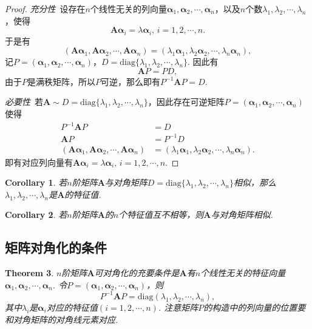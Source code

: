 \documentclass{article}
\newtheorem{theorem}{Theorem}[section]
\newtheorem{corollary}[theorem]{Corollary}
\newcommand{\mbf}[1]{\bm{#1}}
\begin{document}
\begin{proof}
\rm \emph{充分性}\ 设存在$n$个线性无关的列向量$\mbf{\alpha}_1,\mbf{\alpha}_2,\cdots,\mbf{\alpha}_n$，以及$n$个数$\lambda_1,\lambda_2,\cdots,\lambda_n$，使得
$$
\mbf{A}\mbf{\alpha}_i = \lambda\mbf{\alpha}_i,\, i = 1,2,\cdots,n.
$$
于是有
$$
(\mbf{A}\mbf{\alpha}_1,\mbf{A}\mbf{\alpha}_2,\cdots,\mbf{A}\mbf{\alpha}_n) = (\lambda_1\mbf{\alpha}_1,\lambda_2\mbf{\alpha}_2,\cdots,\lambda_n\mbf{\alpha}_n),
$$
记$P=(\mbf{\alpha}_1,\mbf{\alpha}_2,\cdots,\mbf{\alpha}_n)，D = \text{diag}\{\lambda_1,\lambda_2,\cdots,\lambda_n\}$. 因此有
$$
\mbf{A}P = PD,
$$
由于$P$是满秩矩阵，所以$P$可逆，那么即有$P^{-1}\mbf{A}P = D$.

\emph{必要性}\ 若$\mbf{A} \sim D=\text{diag}\{\lambda_1,\lambda_2,\cdots,\lambda_n\}$，因此存在可逆矩阵$P=(\mbf{\alpha}_1,\mbf{\alpha}_2,\cdots,\mbf{\alpha}_n)$使得
$$
\begin{array}{rl}
P^{-1}\mbf{A}P &= D\\
\mbf{A}P &= P^{-1}D\\
(\mbf{A}\mbf{\alpha}_1,\mbf{A}\mbf{\alpha}_2,\cdots,\mbf{A}\mbf{\alpha}_n) &= (\lambda_1\mbf{\alpha}_1,\lambda_2\mbf{\alpha}_2,\cdots,\lambda_n\mbf{\alpha}_n).
\end{array}
$$
即有对应列向量有$\mbf{A}\mbf{\alpha}_i = \lambda\mbf{\alpha}_i,\, i = 1,2,\cdots,n.$
\end{proof}

\begin{corollary}
\rm 若$n$阶矩阵$\mbf{A}$与对角矩阵$D=\text{diag}\{\lambda_1,\lambda_2,\cdots,\lambda_n\}$相似，那么$\lambda_1,\lambda_2,\cdots,\lambda_n$是$\mbf{A}$的特征值.
\end{corollary}


\begin{corollary}
\rm 若$n$阶矩阵$\mbf{A}$的$n$个特征值互不相等，则$\mbf{A}$与对角矩阵相似.
\end{corollary}

\subsection{矩阵对角化的条件}

\begin{theorem}
\rm $n$阶矩阵$\mbf{A}$可对角化的充要条件是$\mbf{A}$有$n$个线性无关的特征向量$\mbf{\alpha}_1,\mbf{\alpha}_2,\cdots,\mbf{\alpha}_n$. 令$P=(\mbf{\alpha}_1,\mbf{\alpha}_2,\cdots,\mbf{\alpha}_n)$，则
$$
P^{-1}\mbf{A}P = \text{diag}(\lambda_1,\lambda_2,\cdots,\lambda_n),
$$
其中$\lambda_i$是$\mbf{\alpha}_i$对应的特征值$(i=1,2,\cdots,n)$. {\color{blue} 注意矩阵$P$的构造中的列向量的位置要和对角矩阵的对角线元素对应}.
\end{theorem}
\end{document}
